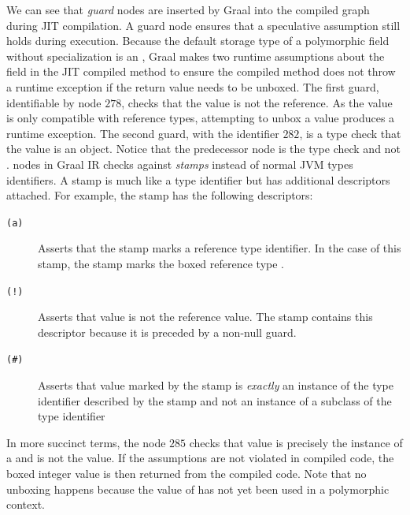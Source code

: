 We can see that \textit{guard} nodes are inserted by Graal into the compiled graph during JIT compilation.
A guard node ensures that a speculative assumption still holds during execution.
Because the default storage type of a polymorphic field without specialization is an , Graal makes two runtime assumptions about the field in the JIT compiled  method to ensure the compiled method does not throw a runtime exception if the return value needs to be unboxed.
The first guard, identifiable by node $278$, checks that the value is not the  reference.
As the  value is only compatible with reference types, attempting to unbox a  value produces a runtime exception.
The second guard, with the identifier $282$, is a type check that the value is an  object.
Notice that the predecessor node is the type check  and not .
 nodes in Graal IR checks against \textit{stamps} instead of normal JVM types identifiers.
A stamp is much like a type identifier but has additional descriptors attached.
For example, the stamp  has the following descriptors:

\begin{description}
	\item[\texttt{(a)}] Asserts that the stamp marks a reference type identifier. In the case of this stamp, the stamp marks the boxed reference type .
	\item[\texttt{(!)}] Asserts that value is not the  reference value. The stamp contains this descriptor because it is preceded by a non-null guard.
	\item[\texttt{(\#)}] Asserts that value marked by the stamp is \textit{exactly} an instance of the type identifier described by the stamp and not an instance of a subclass of the type identifier
\end{description}

In more succinct terms, the  node $285$ checks that value is precisely the instance of a  and is not the  value. 
If the assumptions are not violated in compiled code, the boxed integer value is then returned from the compiled code.
Note that no unboxing happens because the value of  has not yet been used in a polymorphic context.


